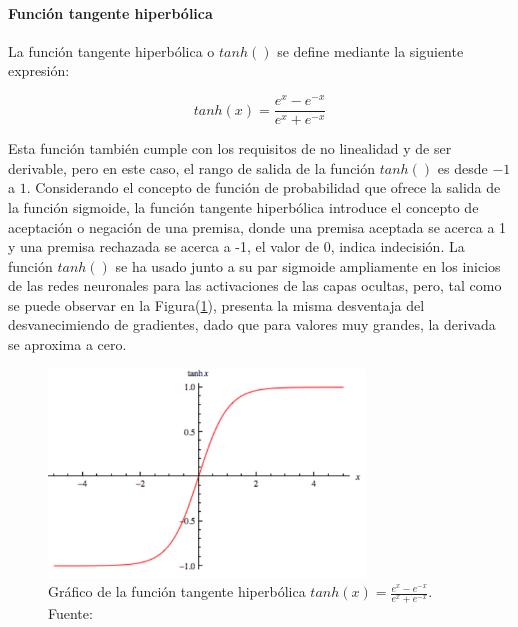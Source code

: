             \paragraph{Función tangente hiperbólica} \label{sec:tanh}
            La función tangente hiperbólica o $tanh()$ se define mediante la siguiente expresión:

            \begin{equation}\label{eq:tanh}
                tanh(x) = \frac{e^x - e^{-x}}{e^x + e^{-x}}
            \end{equation}

            Esta función también cumple con los requisitos de no linealidad y de ser derivable, pero en este caso, el rango de 
            salida de la función $tanh()$ es desde $-1$ a $1$. Considerando el concepto de función de probabilidad que ofrece 
            la salida de la función sigmoide, la función tangente hiperbólica introduce el concepto de aceptación o negación 
            de una premisa, donde una premisa aceptada se acerca a 1 y una premisa rechazada se acerca a -1, el valor de 0, 
            indica indecisión. La función $tanh()$ se ha usado junto a su par sigmoide ampliamente en los inicios de las redes 
            neuronales para las activaciones de las capas ocultas, pero, tal como se puede observar en la Figura(\ref{fig:tanh}), 
            presenta la misma desventaja del desvanecimiendo de gradientes, dado que para valores muy grandes, la derivada se 
            aproxima a cero.

            \begin{figure}[!h] 
                \centering
                \includegraphics[width=0.75\textwidth]{img/tanh}
                \caption{Gráfico de la función tangente hiperbólica $tanh(x) = \frac{e^x - e^{-x}}{e^x + e^{-x}}$. Fuente: \cite{wang_2016} }
                \label{fig:tanh}
            \end{figure}

